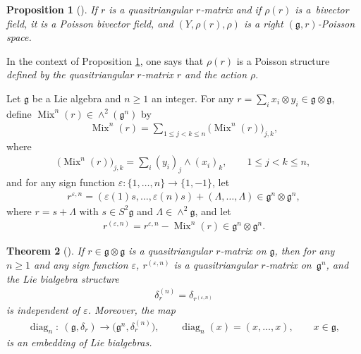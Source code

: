 \documentclass[10pt,a4paper]{amsart}
\numberwithin{equation}{section}
\newtheorem{Theorem}{Theorem}[section]
\newtheorem{Proposition}[Theorem]{Proposition}
{ \theoremstyle{definition}
\newtheorem{Definition}[Theorem]{Definition}
\newtheorem{Example}[Theorem]{Example}
\newtheorem{Remark}[Theorem]{Remark} }
\def \g {\mathfrak{a}}
\def \g {\mathfrak{g}}
\DeclareMathOperator{\diag}{diag}
\DeclareMathOperator{\Mix}{Mix}
\begin{document}
\begin{Proposition}[{\cite[Proposition 2.18]{Lu-Mou:mixed}}]\label{Poi-def-r}
If $r$ is a quasitriangular $r$-matrix and if $\rho(r)$ is a~bivector field, it is a Poisson bivector field, and $(Y, \rho(r), \rho)$ is a right $(\g, r)$-Poisson space.
\end{Proposition}

In the context of Proposition \ref{Poi-def-r}, one says that $\rho(r)$ is a Poisson structure {\it def\/ined by the quasitriangular $r$-matrix $r$ and the action $\rho$}.

Let $\g$ be a Lie algebra and $n \geq 1$ an integer. For any $r = \sum_i x_i \otimes y_i \in \g \otimes \g$, def\/ine $\Mix^n(r) \in \wedge^2 (\g^n)$ by
\begin{gather}
\Mix^n(r) = \sum_{1 \leq j < k \leq n} \big( \Mix^n(r) \big)_{j,k}, \label{Mix^n(r)}
\end{gather}
where
\begin{gather*}
\big( \Mix^n(r) \big)_{j,k} = \sum_i (y_i)_j \wedge (x_i)_k, \qquad 1 \leq j < k \leq n,
\end{gather*}
and for any sign function $\varepsilon\colon \{1, \ldots, n\} \to \{1, -1\}$, let
\begin{gather*}
r^{\varepsilon, n} = (\varepsilon(1)s, \ldots, \varepsilon(n)s) + (\Lambda, \ldots, \Lambda) \in \g^n \otimes \g^n,
\end{gather*}
where $r = s + \Lambda$ with $s \in S^2\g$ and $\Lambda \in \wedge^2 \g$, and let
\begin{gather}
r^{(\varepsilon, n)} = r^{\varepsilon, n} - \Mix^n(r) \in \g^n \otimes \g^n. \label{defn-r^(n)}
\end{gather}

\begin{Theorem}[{\cite[Theorem 6.2]{Lu-Mou:mixed}}] \label{r^(n)}
If $r \in \g \otimes \g$ is a quasitriangular $r$-matrix on $\g$, then for any $n \geq 1$ and any sign function $\varepsilon$, $r^{(\varepsilon, n)}$ is a quasitriangular $r$-matrix on~$\g^n$, and the Lie bialgebra structure
\begin{gather}
\delta_r^{(n)} = \delta_{r^{(\varepsilon, n)}} \label{delta_r^n}
\end{gather}
is independent of $\varepsilon$. Moreover, the map
\begin{gather*}
\diag_n\colon \ (\g, \delta_r) \to \big(\g^n, \delta_r^{(n)}\big), \qquad \diag_n(x) = (x, \ldots, x), \qquad x \in \g, %
\end{gather*}
is an embedding of Lie bialgebras.
\end{Theorem}
\end{document}
